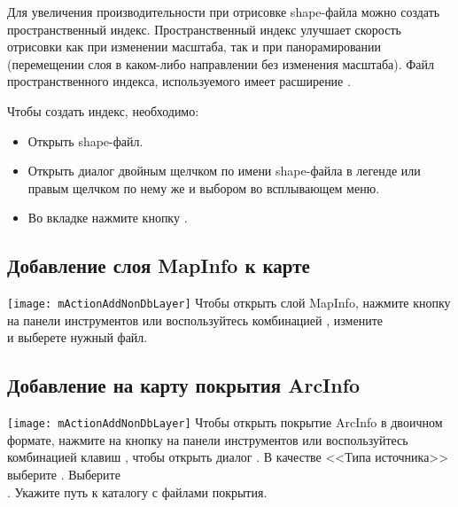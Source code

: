 Для увеличения производительности при отрисовке shape-файла можно создать
пространственный индекс. Пространственный индекс 
улучшает скорость отрисовки как при изменении масштаба, так и при
панорамировании (перемещении слоя в каком-либо направлении без изменения
масштаба). Файл пространственного индекса, используемого \qg имеет
расширение .

Чтобы создать индекс, необходимо:

\begin{itemize}[label=--]
\item Открыть shape-файл.
\item Открыть диалог  двойным щелчком по имени
shape-файла в легенде или правым щелчком по нему же и выбором
 во всплывающем меню.
\item Во вкладке  нажмите кнопку .
\end{itemize}

\subsection{Добавление слоя MapInfo к карте}

\texttt{[image: mActionAddNonDbLayer]} Чтобы открыть слой
MapInfo, нажмите кнопку  на панели инструментов или воспользуйтесь комбинацией
, измените \\
и выберете нужный файл.

\subsection{Добавление на карту покрытия ArcInfo}

\texttt{[image: mActionAddNonDbLayer]} Чтобы открыть покрытие ArcInfo
в двоичном формате, нажмите на кнопку
 на панели
инструментов или воспользуйтесь комбинацией клавиш ,
чтобы открыть диалог . В качестве
<<Типа источника>> выберите . Выберите \\
. Укажите путь к каталогу
с файлами покрытия.

